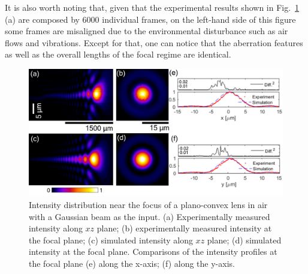 \documentclass[9pt,twocolumn,twoside]{osajnl}
\begin{document}
It is also worth noting that, given that the experimental results shown in Fig.~\ref{fig:3} (a) are composed by 6000 individual frames, on the left-hand side of this figure some frames are misaligned due to the environmental disturbance such as air flows and vibrations.    
Except for that, one can notice that the aberration features as well as the overall lengths of the focal regime are identical.

\begin{figure}[t]
	\centering
	\includegraphics[width=\linewidth]{../AppOptics/figures/LA1951air.pdf}
	\caption{Intensity distribution near the focus of a plano-convex lens in air with a Gaussian beam as the input. (a) Experimentally measured intensity along $xz$ plane; (b) experimentally measured intensity at the focal plane; (c) simulated intensity along $xz$ plane; (d) simulated intensity at the focal plane. Comparisons of the intensity profiles at the focal plane (e) along the x-axis; (f) along the y-axis.}\label{fig:3}
\end{figure}
\end{document}
